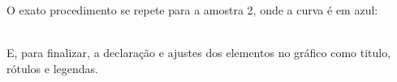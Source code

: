 \documentclass[12pt]{article}
\newenvironment{question}[2][Questão]{\begin{trivlist}
\item[\hskip \labelsep {\bfseries #1}\hskip \labelsep {\bfseries #2.}]}{\end{trivlist}}
\begin{document}
\begin{question}{2}
	O exato procedimento se repete para a amostra 2, onde a curva é em azul:\\
	\begin{algorithm}
		\begin{algorithmic}[1]
			\EndFor
		\end{algorithmic}
	\end{algorithm}\\
	E, para finalizar, a declaração e ajustes dos elementos no gráfico como titulo, rótulos e legendas.\\

\end{question}
\end{document}
